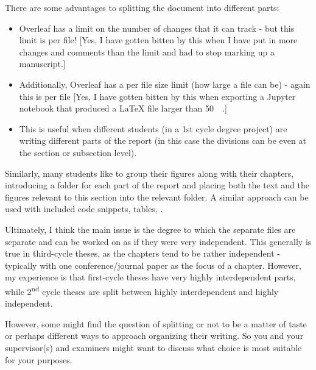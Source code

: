 \documentclass[main.tex]{subfiles}
\begin{document}
There are some advantages to splitting the document into different parts:
\begin{itemize}
\item    Overleaf has a limit on the number of changes that it can track - but this limit is per file!  [Yes, I have gotten bitten by this when I have put in more changes and comments than the limit and had to stop marking up  a manuscript.]

\item    Additionally, Overleaf has a per file size limit (\ie how large a file can be) - again this is per file [Yes, I have gotten bitten by this when exporting a Jupyter notebook that produced a LaTeX file larger than \SI{50}{\mega\byte}.]

\item    This is useful when different students (in a 1st cycle degree project) are writing different parts of the report (in this case the divisions can be even at the section or subsection level).
\end{itemize}

Similarly, many students like to group their figures along with their chapters, \ie introducing a folder for each part of the report and placing both the text and the figures relevant to this section into the relevant folder. A similar approach can be used with included code snippets, tables, \etc.

Ultimately, I think the main issue is the degree to which the separate files are separate and can be worked on as if they were very independent. This generally is true in third-cycle theses, as the chapters tend to be rather independent - typically with one conference/journal paper as the focus of a chapter. However, my experience is that first-cycle theses have very highly interdependent parts, while 2\textsuperscript{nd} cycle theses are split between highly interdependent and highly independent.

However, some might find the question of splitting or not to be a matter of taste or perhaps different ways to approach organizing their writing. So you and your supervisor(s) and examiners might want to discuss what choice is most suitable for your purposes.
\end{document}
